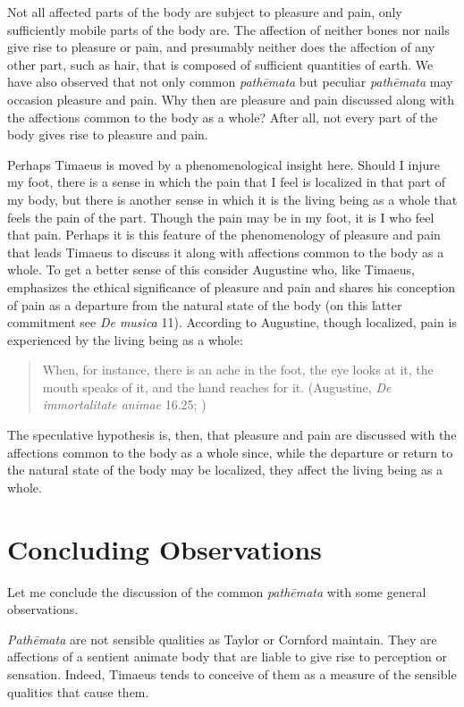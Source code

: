 Not all affected parts of the body are subject to pleasure and pain, only sufficiently mobile parts of the body are. The affection of neither bones nor nails give rise to pleasure or pain, and presumably neither does the affection of any other part, such as hair, that is composed of sufficient quantities of earth. We have also observed that not only common \emph{pathēmata} but peculiar \emph{pathēmata} may occasion pleasure and pain. Why then are pleasure and pain discussed along with the affections common to the body as a whole? After all, not every part of the body gives rise to pleasure and pain.

Perhaps Timaeus is moved by a phenomenological insight here. Should I injure my foot, there is a sense in which the pain that I feel is localized in that part of my body, but there is another sense in which it is the living being as a whole that feels the pain of the part. Though the pain may be in my foot, it is I who feel that pain. Perhaps it is this feature of the phenomenology of pleasure and pain that leads Timaeus to discuss it along with affections common to the body as a whole. To get a better sense of this consider Augustine who, like Timaeus, emphasizes the ethical significance of pleasure and pain and shares his conception of pain as a departure from the natural state of the body (on this latter commitment see \emph{De musica} 11). According to Augustine, though localized, pain is experienced by the living being as a whole:
\begin{quote}
	When, for instance, there is an ache in the foot, the eye looks at it, the mouth speaks of it, and the hand reaches for it. (Augustine, \emph{De immortalitate animae} 16.25; \citealt[46]{Schopp:1947df})
\end{quote}
The speculative hypothesis is, then, that pleasure and pain are discussed with the affections common to the body as a whole since, while the departure or return to the natural state of the body may be localized, they affect the living being as a whole.


\section{Concluding Observations} %
\label{sec:concluding_observations_cp}

Let me conclude the discussion of the common \emph{pathēmata} with some general observations. 

\emph{Pathēmata} are not sensible qualities as Taylor or Cornford maintain. They are affections of a sentient animate body that are liable to give rise to perception or sensation. Indeed, Timaeus tends to conceive of them as a measure of the sensible qualities that cause them.

